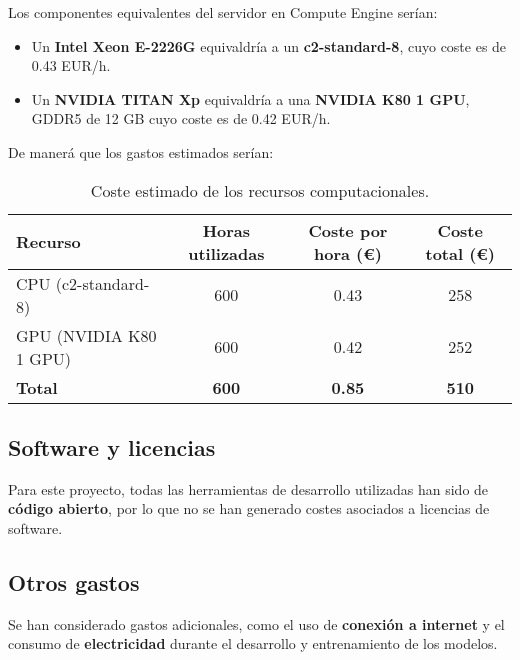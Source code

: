 Los componentes equivalentes del servidor en Compute Engine serían:
\begin{itemize}
    \item Un \textbf{Intel Xeon E-2226G} equivaldría a un \textbf{c2-standard-8}, cuyo coste es de 0.43 EUR/h.
    \item Un \textbf{NVIDIA TITAN Xp} equivaldría a una \textbf{NVIDIA K80 1 GPU}, GDDR5 de 12 GB cuyo coste es de 0.42
          EUR/h.
\end{itemize}

De manerá que los gastos estimados serían:
\begin{table}[htp]\label{tab:recursos-computacionales}
    \centering
    \begin{adjustbox}{width=\linewidth}
        \begin{tabular}{|l|c|c|c|}
            \hline
            \textbf{Recurso}       & \textbf{Horas utilizadas} & \textbf{Coste por hora (€)} &
            \textbf{Coste total (€)}                                                                        \\ \hline
            CPU (c2-standard-8)    & 600                       & 0.43                        & 258          \\
            GPU (NVIDIA K80 1 GPU) & 600                       & 0.42                        & 252          \\ \hline
            \textbf{Total}         & \textbf{600}              & \textbf{0.85}               & \textbf{510} \\ \hline
        \end{tabular}
    \end{adjustbox}
    \caption{Coste estimado de los recursos computacionales.}
\end{table}


\subsection{Software y licencias}\label{subsec:software-y-licencias}
Para este proyecto, todas las herramientas de desarrollo utilizadas han sido de \textbf{código abierto}, por lo que no
se han generado costes asociados a licencias de software.

\subsection{Otros gastos}\label{subsec:otros-gastos}
Se han considerado gastos adicionales, como el uso de \textbf{conexión a internet} y el consumo de
\textbf{electricidad} durante el desarrollo y entrenamiento de los modelos.

